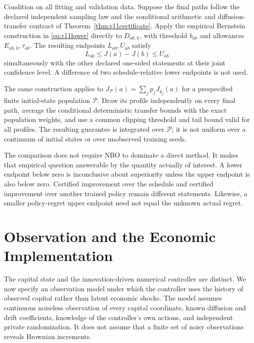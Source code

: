 \begin{theorem}\label{thm:r12paired}
Condition on all fitting and validation data. Suppose the final paths follow the declared independent sampling law and the conditional arithmetic and diffusion-transfer contract of Theorem~\ref{thm:r11certificate}. Apply the empirical Bernstein construction in \eqref{eq:r11lower} directly to $D_{ab,h}$, with threshold $b_{ab}$ and allowances $E_{ab,h},\tau_{ab}$. The resulting endpoints $L_{ab},U_{ab}$ satisfy
\[
 L_{ab}\leq J(a)-J(b)\leq U_{ab}
\]
simultaneously with the other declared one-sided statements at their joint confidence level. A difference of two schedule-relative lower endpoints is not used.

The same construction applies to $J_{\mathcal P}(a)=\sum_j p_jJ_{y_j}(a)$ for a prespecified finite initial-state population $\mathcal P$. Draw its profile independently on every final path, average the conditional deterministic transfer bounds with the exact population weights, and use a common clipping threshold and tail bound valid for all profiles. The resulting guarantee is integrated over $\mathcal P$; it is not uniform over a continuum of initial states or over unobserved training seeds.
\end{theorem}

The comparison does not require NBO to dominate a direct method. It makes that empirical question answerable by the quantity actually of interest. A lower endpoint below zero is inconclusive about superiority unless the upper endpoint is also below zero. Certified improvement over the schedule and certified improvement over another trained policy remain different statements. Likewise, a smaller policy-regret upper endpoint need not equal the unknown actual regret.

\section{Observation and the Economic Implementation}\label{sec:r12observation}
The capital state and the innovation-driven numerical controller are distinct. We now specify an observation model under which the controller uses the history of observed capital rather than latent economic shocks. The model assumes continuous noiseless observation of every capital coordinate, known diffusion and drift coefficients, knowledge of the controller's own actions, and independent private randomization. It does not assume that a finite set of noisy observations reveals Brownian increments.


